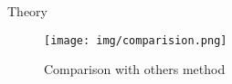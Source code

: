 \begin{frame}{Theory}
\begin{figure}
    \centering
    \texttt{[image: img/comparision.png]}
    \caption{Comparison with others method\footnotemark[1]}
    \label{fig:original}
\end{figure}
\end{frame}